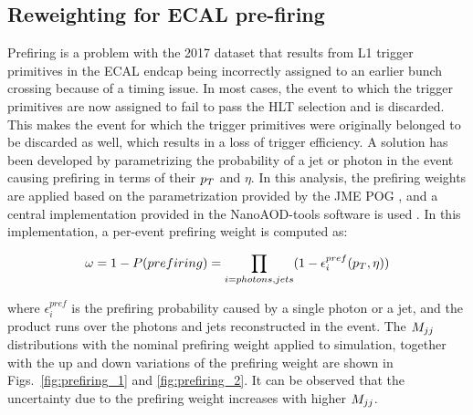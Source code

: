 \clearpage

\subsection{Reweighting for ECAL pre-firing}
\label{subsec:prefiring_weighting}

Prefiring is a problem with the 2017 dataset that results from L1 trigger primitives
in the ECAL endcap being incorrectly assigned to an earlier bunch crossing because
of a timing issue. In most cases, the event to which the trigger primitives are now assigned to
fail to pass the HLT selection and is discarded. This makes the event for which the trigger
primitives were originally belonged to be discarded as well, which results in a loss of trigger
efficiency. A solution has been developed by parametrizing
the probability of a jet or photon in the event causing prefiring in terms of their
$p_T$ and $\eta$. In this analysis, the prefiring weights are applied based on the parametrization
provided by the JME POG \cite{CMS:PrefiringTwiki}, and a central implementation provided in the
NanoAOD-tools software is used \cite{CMS:PrefiringNanoAODTools}. In this implementation, a per-event
prefiring weight is computed as:

\begin{equation}
    \omega = 1 - P(prefiring) = \prod_{i=photons,jets} (1 - \epsilon_{i}^{pref}(p_T, \eta))
\end{equation}

where $\epsilon_{i}^{pref}$ is the prefiring probability caused by a single photon or a jet, and the product
runs over the photons and jets reconstructed in the event.
The $M_{jj}$ distributions with the nominal prefiring weight applied to simulation, together with the
up and down variations of the prefiring weight are shown in Figs.~\ref{fig:prefiring_1} and \ref{fig:prefiring_2}.
It can be observed that the uncertainty due to the prefiring weight increases with higher $M_{jj}$. 

